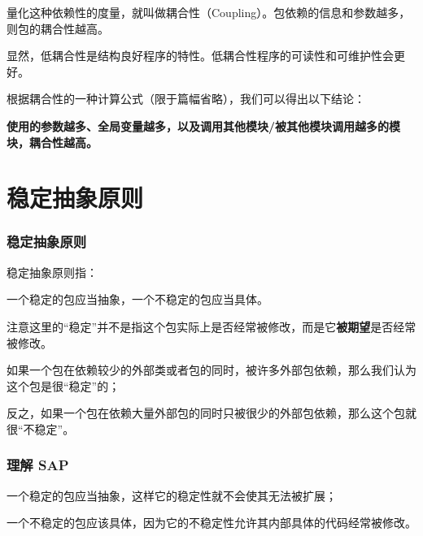 \documentclass{ctexbeamer}
\begin{document}
    \begin{frame}
        量化这种依赖性的度量，就叫做耦合性（Coupling）。包依赖的信息和参数越多，则包的耦合性越高。\pause

        显然，低耦合性是结构良好程序的特性。低耦合性程序的可读性和可维护性会更好。\pause

        根据耦合性的一种计算公式（限于篇幅省略），我们可以得出以下结论：\pause

        \textbf{使用的参数越多、全局变量越多，以及调用其他模块/被其他模块调用越多的模块，耦合性越高。}
    \end{frame}

    \section{稳定抽象原则}
    \begin{frame}
        \frametitle{稳定抽象原则}
    
        稳定抽象原则指：
        
        一个稳定的包应当抽象，一个不稳定的包应当具体。
    \end{frame}

    \begin{frame}

        注意这里的“稳定”并不是指这个包实际上是否经常被修改，而是它\textbf{被期望}是否经常被修改。\pause

        如果一个包在依赖较少的外部类或者包的同时，被许多外部包依赖，那么我们认为这个包是很“稳定”的；\pause

        反之，如果一个包在依赖大量外部包的同时只被很少的外部包依赖，那么这个包就很“不稳定”。
    
    \end{frame}

    \begin{frame}
        \frametitle{理解 SAP}
    
        一个稳定的包应当抽象，这样它的稳定性就不会使其无法被扩展；\pause

        一个不稳定的包应该具体，因为它的不稳定性允许其内部具体的代码经常被修改。
    
    \end{frame}
\end{document}
